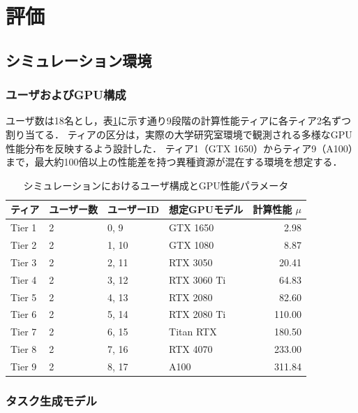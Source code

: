 \documentclass[12pt,a4paper]{jsarticle}
\begin{document}
\section{評価}

\subsection{シミュレーション環境}

\subsubsection{ユーザおよびGPU構成}

ユーザ数は18名とし，表\ref{tab:users}に示す通り9段階の計算性能ティアに各ティア2名ずつ割り当てる．
ティアの区分は，実際の大学研究室環境で観測される多様なGPU性能分布を反映するよう設計した．
ティア1（GTX 1650）からティア9（A100）まで，最大約100倍以上の性能差を持つ異種資源が混在する環境を想定する．

\begin{table}[h]
  \centering
  \caption{シミュレーションにおけるユーザ構成とGPU性能パラメータ}
  \label{tab:users}
  \begin{tabular}{llllr}
    \toprule
    ティア & ユーザー数 & ユーザーID & 想定GPUモデル & 計算性能 $\mu$ \\
    \midrule
    Tier 1 & 2 & 0, 9  & GTX 1650     &   2.98 \\
    Tier 2 & 2 & 1, 10 & GTX 1080     &   8.87 \\
    Tier 3 & 2 & 2, 11 & RTX 3050     &  20.41 \\
    Tier 4 & 2 & 3, 12 & RTX 3060 Ti  &  64.83 \\
    Tier 5 & 2 & 4, 13 & RTX 2080     &  82.60 \\
    Tier 6 & 2 & 5, 14 & RTX 2080 Ti  & 110.00 \\
    Tier 7 & 2 & 6, 15 & Titan RTX    & 180.50 \\
    Tier 8 & 2 & 7, 16 & RTX 4070     & 233.00 \\
    Tier 9 & 2 & 8, 17 & A100         & 311.84 \\
    \bottomrule
  \end{tabular}
\end{table}

\subsubsection{タスク生成モデル}
\end{document}
